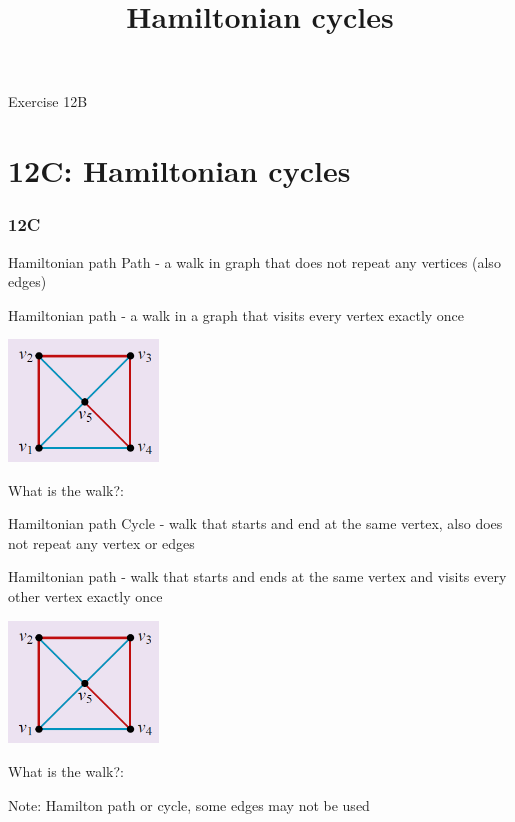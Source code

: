 \documentclass[
	11pt, %
]{beamer}
\begin{document}
\begin{frame}{Exercise 12B}
\end{frame}

\section{12C: Hamiltonian cycles}
\begin{frame}
    \frametitle{12C}
    \begin{center}
        \title{Hamiltonian cycles}
        \maketitle
    \end{center}
\end{frame}

\begin{frame}{Hamiltonian path}
    Path - a walk in graph that does not repeat any vertices (also edges)\\
    \begin{block}{Hamiltonian path}
        - a walk in a graph that visits every vertex exactly once
        \begin{center}
            \includegraphics[width = 4cm]{Hamilton.png}
        \end{center}
        What is the walk?:
    \end{block}
\end{frame}

\begin{frame}{Hamiltonian path}
    Cycle - walk that starts and end at the same vertex, also does not repeat any vertex or edges\\
    \begin{block}{Hamiltonian path}
        - walk that starts and ends at the same vertex and visits every other vertex exactly once
        \begin{center}
            \includegraphics[width = 4cm]{Hamilton.png}
        \end{center}
        What is the walk?:
    \end{block}
    Note: Hamilton path or cycle, some edges may not be used
\end{frame}
\end{document}
